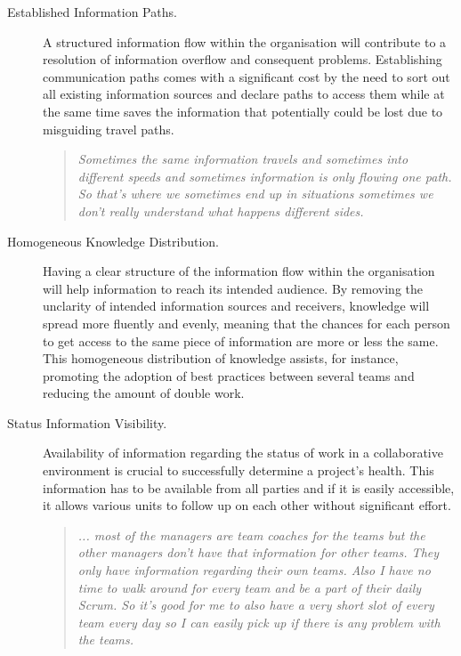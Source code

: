 \begin{description}

   \item[Established Information Paths.] A structured information flow within the organisation will contribute to a resolution of information overflow and consequent problems. Establishing communication paths comes with a significant cost by the need to sort out all existing information sources and declare paths to access them while at the same time saves the information that potentially could be lost due to misguiding travel paths.
   
   \begin{quote}\itshape Sometimes the same information travels and sometimes into different speeds and sometimes information is only flowing one path. So that's where we sometimes end up in situations sometimes we don't really understand what happens different sides.
      \end{quote}

   \item[Homogeneous Knowledge Distribution.] Having a clear structure of the information flow within the organisation will help information to reach its intended audience. By removing the unclarity of intended information sources and receivers, knowledge will spread more fluently and evenly, meaning that the chances for each person to get access to the same piece of information are more or less the same. This homogeneous distribution of knowledge assists, for instance, promoting the adoption of best practices between several teams and reducing the amount of double work.

   \item[Status Information Visibility.] Availability of information regarding the status of work in a collaborative environment is crucial to successfully determine a project's health. This information has to be available from all parties and if it is easily accessible, it allows various units to follow up on each other without significant effort.

\begin{quote}\itshape ... most of the managers are team coaches for the teams but the other managers don't have that information for other teams. They only have information regarding their own teams. Also I have no time to walk around for every team and be a part of their daily Scrum. So it's good for me to also have a very short slot of every team every day so I can easily pick up if there is any problem with the teams.
   \end{quote}

\end{description}

